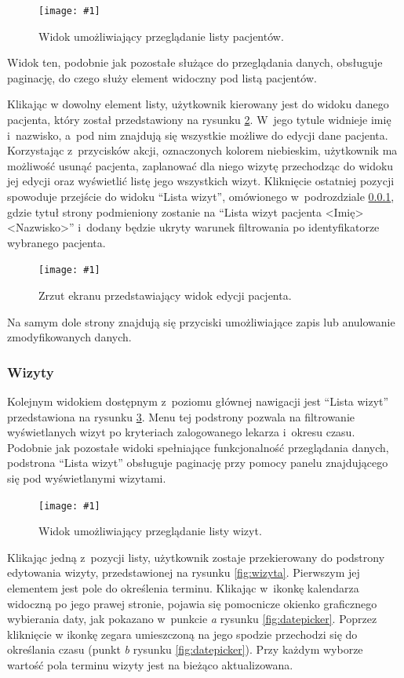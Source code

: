 \documentclass[11pt]{aghdpl}
\newcommand{\fullWidthPicture}[2]{
\begin{figure}[h!]
	\centering
		\texttt{[image: \#1]}
	\caption{#2}
	\label{fig:#1}
\end{figure}
}
\begin{document}
\fullWidthPicture{pacjenci}{Widok umożliwiający przeglądanie listy pacjentów.}

Widok ten, podobnie jak pozostałe służące do przeglądania danych, obsługuje paginację, do czego służy element widoczny pod listą pacjentów.

Klikając w dowolny element listy, użytkownik kierowany jest do widoku danego pacjenta, który został przedstawiony na rysunku \ref{fig:pacjent}. W~jego tytule widnieje imię i~nazwisko, a~pod nim znajdują się wszystkie możliwe do edycji dane pacjenta. Korzystając z~przycisków akcji, oznaczonych kolorem niebieskim, użytkownik ma możliwość usunąć pacjenta, zaplanować dla niego wizytę przechodząc do widoku jej edycji oraz wyświetlić listę jego wszystkich wizyt. Kliknięcie ostatniej pozycji spowoduje przejście do widoku ``Lista wizyt'', omówionego w~podrozdziale \ref{sec:wizyty}, gdzie tytuł strony podmieniony zostanie na ``Lista wizyt pacjenta <Imię> <Nazwisko>'' i~dodany będzie ukryty warunek filtrowania po identyfikatorze wybranego pacjenta.

\fullWidthPicture{pacjent}{Zrzut ekranu przedstawiający widok edycji pacjenta.}

Na samym dole strony znajdują się przyciski umożliwiające zapis lub anulowanie zmodyfikowanych danych.

\subsubsection{Wizyty}
\label{sec:wizyty}

Kolejnym widokiem dostępnym z~poziomu głównej nawigacji jest ``Lista wizyt'' przedstawiona na rysunku \ref{fig:wizyty}. Menu tej podstrony pozwala na filtrowanie wyświetlanych wizyt po kryteriach zalogowanego lekarza i~okresu czasu. Podobnie jak pozostałe widoki spełniające funkcjonalność przeglądania danych, podstrona ``Lista wizyt'' obsługuje paginację przy pomocy panelu znajdującego się pod wyświetlanymi wizytami.

\fullWidthPicture{wizyty}{Widok umożliwiający przeglądanie listy wizyt.}

Klikając jedną z~pozycji listy, użytkownik zostaje przekierowany do podstrony edytowania wizyty,   przedstawionej na rysunku \ref{fig:wizyta}. Pierwszym jej elementem jest pole do określenia terminu. Klikając w~ikonkę kalendarza widoczną po jego prawej stronie, pojawia się pomocnicze okienko graficznego wybierania daty, jak pokazano w~punkcie \emph{a} rysunku \ref{fig:datepicker}. Poprzez kliknięcie w ikonkę zegara umieszczoną na jego spodzie przechodzi się do określania czasu (punkt \emph{b} rysunku \ref{fig:datepicker}). Przy każdym wyborze wartość pola terminu wizyty jest na bieżąco aktualizowana.
\end{document}
